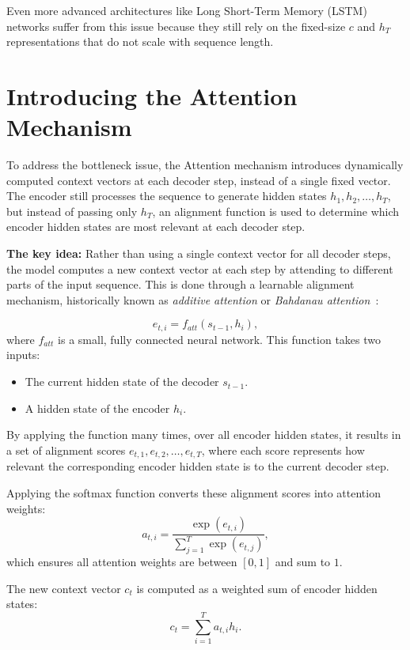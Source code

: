 Even more advanced architectures like Long Short-Term Memory (LSTM) networks suffer from this issue because they still rely on the fixed-size $c$ and $h_T$ representations that do not scale with sequence length.

\section{Introducing the Attention Mechanism}

To address the bottleneck issue, the Attention mechanism introduces dynamically computed context vectors at each decoder step, instead of a single fixed vector. The encoder still processes the sequence to generate hidden states $h_1, h_2, \dots, h_T$, but instead of passing only $h_T$, an alignment function is used to determine which encoder hidden states are most relevant at each decoder step.

\textbf{The key idea:} Rather than using a single context vector for all decoder steps, the model computes a new context vector at each step by attending to different parts of the input sequence. This is done through a learnable alignment mechanism, historically known as \emph{additive attention} or \emph{Bahdanau attention}~\cite{bahdanau2016_neural}:

\begin{equation}
	e_{t,i} = f_{att}(s_{t-1}, h_i),
\end{equation}
where $f_{att}$ is a small, fully connected neural network. This function takes two inputs:
\begin{itemize}
	\item The current hidden state of the decoder $s_{t-1}$.
	\item A hidden state of the encoder $h_i$.
\end{itemize}

By applying the function many times, over all encoder hidden states, it results in a set of alignment scores $e_{t,1}, e_{t,2}, \dots, e_{t,T}$, where each score represents how relevant the corresponding encoder hidden state is to the current decoder step.

Applying the softmax function converts these alignment scores into attention weights:
\begin{equation}
    a_{t,i} = \frac{\exp(e_{t,i})}{\sum_{j=1}^{T} \exp(e_{t,j})},
\end{equation}
which ensures all attention weights are between $[0,1]$ and sum to $1$.

The new context vector $c_t$ is computed as a weighted sum of encoder hidden states:
\begin{equation}
    c_t = \sum_{i=1}^{T} a_{t,i} h_i.
\end{equation}

